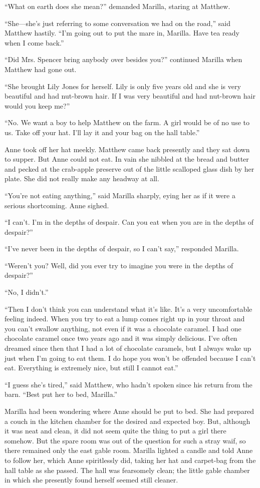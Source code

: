 \documentclass[a4paper]{article}
\begin{document}
``What on earth does she mean?'' demanded Marilla, staring at Matthew.

``She---she's just referring to some conversation we had on the road,'' said Matthew hastily. ``I'm going out to put the mare in, Marilla. Have tea ready when I come back.''

``Did Mrs. Spencer bring anybody over besides you?'' continued Marilla when Matthew had gone out.

``She brought Lily Jones for herself. Lily is only five years old and she is very beautiful and had nut-brown hair. If I was very beautiful and had nut-brown hair would you keep me?''

``No. We want a boy to help Matthew on the farm. A girl would be of no use to us. Take off your hat. I'll lay it and your bag on the hall table.''

Anne took off her hat meekly. Matthew came back presently and they sat down to supper. But Anne could not eat. In vain she nibbled at the bread and butter and pecked at the crab-apple preserve out of the little scalloped glass dish by her plate. She did not really make any headway at all.

``You're not eating anything,'' said Marilla sharply, eying her as if it were a serious shortcoming. Anne sighed.

``I can't. I'm in the depths of despair. Can you eat when you are in the depths of despair?''

``I've never been in the depths of despair, so I can't say,'' responded Marilla.

``Weren't you? Well, did you ever try to imagine you were in the depths of despair?''

``No, I didn't.''

``Then I don't think you can understand what it's like. It's a very uncomfortable feeling indeed. When you try to eat a lump comes right up in your throat and you can't swallow anything, not even if it was a chocolate caramel. I had one chocolate caramel once two years ago and it was simply delicious. I've often dreamed since then that I had a lot of chocolate caramels, but I always wake up just when I'm going to eat them. I do hope you won't be offended because I can't eat. Everything is extremely nice, but still I cannot eat.''

``I guess she's tired,'' said Matthew, who hadn't spoken since his return from the barn. ``Best put her to bed, Marilla.''

Marilla had been wondering where Anne should be put to bed. She had prepared a couch in the kitchen chamber for the desired and expected boy. But, although it was neat and clean, it did not seem quite the thing to put a girl there somehow. But the spare room was out of the question for such a stray waif, so there remained only the east gable room. Marilla lighted a candle and told Anne to follow her, which Anne spiritlessly did, taking her hat and carpet-bag from the hall table as she passed. The hall was fearsomely clean; the little gable chamber in which she presently found herself seemed still cleaner.
\end{document}
